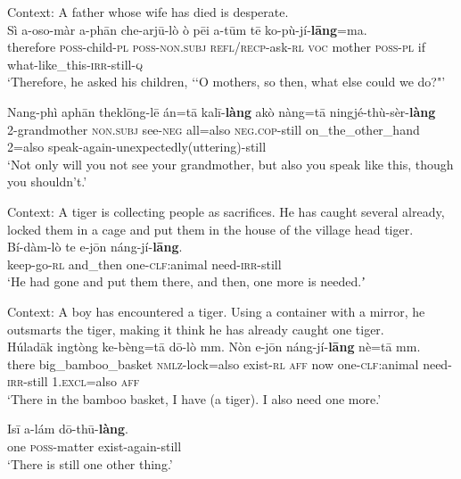 \begin{exe}
 	\ex Context: A father whose wife has died is desperate.\label{exAppendixKarbiAdditive1}\\
	\gll Sì a-oso-màr a-phān che-arjū-lò ò pēi a-tūm tē ko-pù-jí-\textbf{lāng}=ma.\\
	therefore \textsc{poss}-child-\textsc{pl} \textsc{poss}-\textsc{non}.\textsc{subj} \textsc{refl}/\textsc{recp}-ask-\textsc{rl} \textsc{voc} mother \textsc{poss}-\textsc{pl} if what-like\_this-\textsc{irr}-still-\textsc{q}\\
	\glt \lq Therefore, he asked his children, \lq\lq O mothers, so then, what else could we do?"' \parencite[159–169]{KonnerthTisso2018}
 
	\ex\label{exAppendixKarbiAdditive2}
	\gll Nang-phì aphān theklōng-lē án=tā kalī-\textbf{làng} akò nàng=tā ningjé-thù-sèr-\textbf{làng}\\
	2-grandmother \textsc{non}.\textsc{subj} see-\textsc{neg} all=also \textsc{neg}.\textsc{cop}-still on\_the\_other\_hand 2=also speak-again-unexpectedly(uttering)-still\\
	\glt \lq Not only will you not see your grandmother, but also you speak like this, though you shouldn't.' \parencite[232]{KonnerthTisso2018}

	\ex\label{exAppendixKarbiAdditive3}
	Context: A tiger is collecting people as sacrifices. He has caught several already, locked them in a cage and put them in the house of the village head tiger.\\
	\gll Bí-dàm-lò te e-jōn náng-jí-\textbf{lāng}.\\
	keep-go-\textsc{rl} and\_then one-\textsc{clf}:animal need-\textsc{irr}-still\\
	\glt \lq He had gone and put them there, and then, one more is needed.ʼ \parencite[637]{Konnerth2014}
	
	\pagebreak
	\ex\label{exAppendixKarbiAdditive4}
	Context: A boy has encountered a tiger. Using a container with a mirror, he outsmarts the tiger, making it think he has already caught one tiger.\\
	\gll Húladāk ingtòng ke-bèng=tā dō-lò mm. Nòn e-jōn náng-jí-\textbf{lāng} nè=tā mm.\\
	there big\_bamboo\_basket \textsc{nmlz}-lock=also exist-\textsc{rl} \textsc{aff} now one-\textsc{clf}:animal need-\textsc{irr}-still 1.\textsc{excl}=also \textsc{aff}\\
	\glt \lq There in the bamboo basket, I have (a tiger). I also need one more.' \parencite[195]{KonnerthTisso2018}
	
	\ex\label{exAppendixKarbiAdditive5}
	\gll Isī a-lám dō-thū-\textbf{làng}.\\
	one \textsc{poss}-matter exist-again-still\\
	\glt \lq There is still one other thing.' \parencite[336]{Konnerth2014}
\end{exe}


